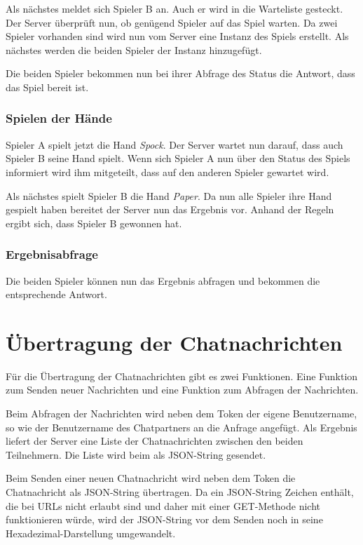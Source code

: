 Als nächstes meldet sich Spieler B an. Auch er wird in die Warteliste gesteckt. Der Server überprüft nun, ob genügend Spieler auf das Spiel warten. Da zwei Spieler vorhanden sind wird nun vom Server eine Instanz des Spiels erstellt. Als nächstes werden die beiden Spieler der Instanz hinzugefügt.

Die beiden Spieler bekommen nun bei ihrer Abfrage des Status die Antwort, dass das Spiel bereit ist.

\subsubsection{Spielen der Hände}
Spieler A spielt jetzt die Hand \textit{Spock}. Der Server wartet nun darauf, dass auch Spieler B seine Hand spielt. Wenn sich Spieler A nun über den Status des Spiels informiert wird ihm mitgeteilt, dass auf den anderen Spieler gewartet wird.

Als nächstes spielt Spieler B die Hand \textit{Paper}. Da nun alle Spieler ihre Hand gespielt haben bereitet der Server nun das Ergebnis vor. Anhand der Regeln ergibt sich, dass Spieler B gewonnen hat.

\subsubsection{Ergebnisabfrage}
Die beiden Spieler können nun das Ergebnis abfragen und bekommen die entsprechende Antwort.

\section{Übertragung der Chatnachrichten}
Für die Übertragung der Chatnachrichten gibt es zwei Funktionen. Eine Funktion zum Senden neuer Nachrichten und eine Funktion zum Abfragen der Nachrichten.

Beim Abfragen der Nachrichten wird neben dem Token der eigene Benutzername, so wie der Benutzername des Chatpartners an die Anfrage angefügt. Als Ergebnis liefert der Server eine Liste der Chatnachrichten zwischen den beiden Teilnehmern. Die Liste wird beim  als JSON-String gesendet.

Beim Senden einer neuen Chatnachricht wird neben dem Token die Chatnachricht als JSON-String übertragen. Da ein JSON-String Zeichen enthält, die bei URLs nicht erlaubt sind und daher mit einer GET-Methode nicht funktionieren würde, wird der JSON-String vor dem Senden noch in seine Hexadezimal-Darstellung umgewandelt.